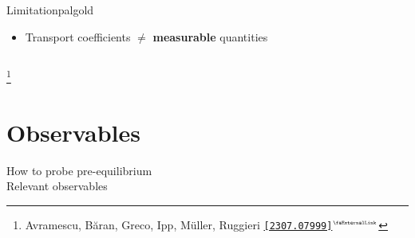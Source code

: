 \documentclass[aspectratio=169,11pt,usenames,dvipsnames]{beamer}
\renewcommand{\thefootnote}{\color{customblue}\faPaperPlaneO}
\newcommand\blfootnote[1]{%
  \begingroup
  \renewcommand\thefootnote{}\footnote{#1}%
  \addtocounter{footnote}{-1}%
  \endgroup
}
\begin{document}
\begin{frame}[noframenumbering]
\begin{columns}[onlytextwidth,t]
        \begin{custombox2}{Limitation}{palgold}
            \small
            \begin{varwidth}{0.77\textwidth}
            \begin{itemize}\itemsep0em 
                \item Transport coefficients $\neq$ {\color{palgold}\bfseries measurable} quantities
            \end{itemize}
            \end{varwidth}
        \end{custombox2} 
              
    \end{columns}
    \blfootnote{\scriptsize Avramescu, Băran, Greco, Ipp, Müller, Ruggieri  \href{https://arxiv.org/abs/2307.07999}{{\color{palgold}\texttt{[2307.07999]}$^\text{\tiny\faExternalLink}$}}}
\end{frame}


\section{Observables}

\begin{frame}{}
    \begin{center}
        \vspace{1cm}
        {\large\color{normal}How to probe pre-equilibrium}\\[0.3cm]
        {\huge\color{destacado}Relevant observables}\\[0.3cm]
    \end{center}
\end{frame}
\end{document}
